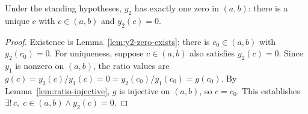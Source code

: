 \begin{theorem}
    \label{thm:sturm-separation}
    \leanok
    Under the standing hypotheses, $y_2$ has exactly one zero in $(a,b)$:
    there is a unique $c$ with $c \in (a,b)$ and $y_2(c) = 0$.
\end{theorem}
\begin{proof}
    Existence is Lemma~\ref{lem:y2-zero-exists}: there is $c_0 \in (a,b)$ with
    $y_2(c_0) = 0$. For uniqueness, suppose $c \in (a,b)$ also satisfies
    $y_2(c) = 0$. Since $y_1$ is nonzero on $(a,b)$, the ratio values are
    $g(c) = y_2(c)/y_1(c) = 0 = y_2(c_0)/y_1(c_0) = g(c_0)$. By
    Lemma~\ref{lem:ratio-injective}, $g$ is injective on $(a,b)$, so $c = c_0$.
    This establishes $\exists!\,c,\; c \in (a,b) \wedge y_2(c) = 0$.
\end{proof}


